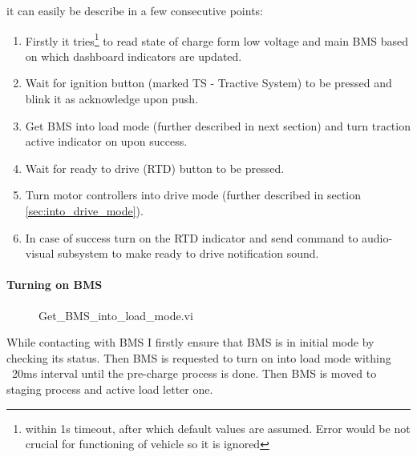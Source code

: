 it can easily be describe in a few consecutive points:
\begin{enumerate}
    \itemsep0.1em 
    \item Firstly it tries\footnote{within 1s timeout, after which default values are assumed. Error would be not crucial for functioning of vehicle so it is ignored} to read state of charge form low voltage and main BMS based on which dashboard indicators are updated.
    \item Wait for ignition button (marked TS - Tractive System) to be pressed and blink it as acknowledge upon push.
    \item Get BMS into load mode (further described in next section) and turn traction active indicator on upon success.
    \item Wait for ready to drive (RTD) button to be pressed.
    \item Turn motor controllers into drive mode (further described in section \ref{sec:into_drive_mode}).
    \item In case of success turn on the RTD indicator and send command to audio-visual subsystem to make ready to drive notification sound.
\end{enumerate}

\paragraph{Turning on BMS}
\begin{figure}[H]
    \centering
    \renewcommand{\thesubfigure}{}%
    \tightsubcaptions %
    \setlength{\subfloatlabelskip}{0pt}%
\end{figure}
\begin{figure}[H]\ContinuedFloat
    \centering
    \renewcommand{\thesubfigure}{}%
    \tightsubcaptions %
    \setlength{\subfloatlabelskip}{0pt}%
    \caption{Get\_BMS\_into\_load\_mode.vi}
    \label{vi:boot_BMS}
\end{figure}
While contacting with BMS I firstly ensure that BMS is in initial mode by checking its status. Then BMS is requested to turn on into load mode withing ~20ms interval until the pre-charge process is done. Then BMS is moved to staging process and active load letter one.

